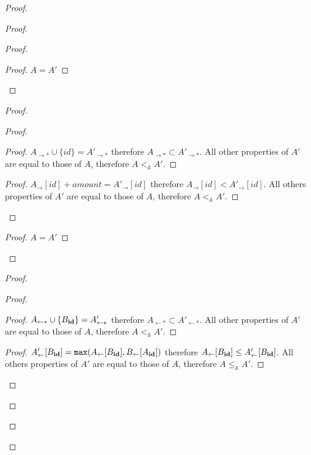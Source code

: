 \documentclass[9pt, oneside]{article}   	%
\begin{document}
\begin{proof}
\begin{proof}
\begin{proof}
			\begin{proof}
				$A=A'$
			\end{proof}
		\end{proof}
		
		\begin{proof}
			\begin{proof}
				\begin{proof}
					$A_{\rightarrow *} \cup \{ \textit{id} \} = A'_{\rightarrow *}$ therefore $A_{\rightarrow *} \subset A'_{\rightarrow *}$. All other properties of $A'$ are equal to those of $A$, therefore $A <_\mathds{A} A'$.
				\end{proof}
				
				\begin{proof}
					$A_\rightarrow[id] + \textit{amount} = A'_\rightarrow[id]$ therefore $A_\rightarrow[id] < A'_\rightarrow[id]$. All others properties of $A'$ are equal to those of $A$, therefore $A <_\mathds{A} A'$.
				\end{proof} 
			\end{proof}
			
			\begin{proof}
				$A=A'$
			\end{proof}
		\end{proof}
		
		\begin{proof}
			\begin{proof}
				\begin{proof}
					$A_{\leftarrow *} \cup \{ B_{\scriptsize \textbf{id}} \} = A'_{\leftarrow *}$ therefore $A_{\leftarrow *} \subset A'_{\leftarrow *}$. All other properties of $A'$ are equal to those of $A$, therefore $A <_\mathds{A} A'$.
				\end{proof}
				
				\begin{proof}
					$A'_\leftarrow[B_{\scriptsize \textbf{id}}] = \texttt{max}(A_\leftarrow[B_{\scriptsize \textbf{id}}], B_\leftarrow[A_{\scriptsize \textbf{id}}])$ therefore $A_\leftarrow[B_{\scriptsize \textbf{id}}] \leq A'_\leftarrow[B_{\scriptsize \textbf{id}}]$. All others properties of $A'$ are equal to those of $A$, therefore $A \leq_\mathds{A} A'$.
				\end{proof} 
			\end{proof}
			

\end{proof}
\end{proof}
\end{proof}
\end{document}

